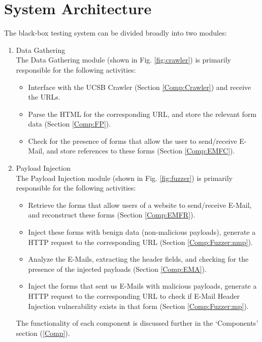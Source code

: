 \section{System Architecture}
\label{sys:arch}
The black-box testing system can be divided broadly into two modules:
\begin{enumerate}
	\item Data Gathering\\
		The Data Gathering module (shown in Fig. \ref{fig:crawler}) is primarily responsible for the following activities:
		\begin{itemize}
			\item Interface with the UCSB Crawler (Section \ref{Comp:Crawler}) and receive the URLs.
			\item Parse the HTML for the corresponding URL, and store the relevant form data (Section \ref{Comp:FP}).
			\item Check for the presence of forms that allow the user to send/receive E-Mail, and store references to these forms (Section \ref{Comp:EMFC}).
		\end{itemize} 
	\item Payload Injection\\
		The Payload Injection module (shown in Fig. \ref{fig:fuzzer}) is primarily responsible for the following activities:
		\begin{itemize}
			\item Retrieve the forms that allow users of a website to send/receive E-Mail, and reconstruct these forms (Section \ref{Comp:EMFR}).
			\item Inject these forms with benign data (non-malicious payloads), generate a HTTP request to the corresponding URL (Section \ref{Comp:Fuzzer:nmp}).
			\item Analyze the E-Mails, extracting the header fields, and checking for the presence of the injected payloads (Section \ref{Comp:EMA}).
			\item Inject the forms that sent us E-Mails with malicious payloads, generate a HTTP request to the corresponding URL to check if E-Mail Header Injection vulnerability exists in that form (Section \ref{Comp:Fuzzer:mp}).
		\end{itemize} 
	The functionality of each component is discussed further in the `Components' section (\ref{Comp}).
\end{enumerate}

